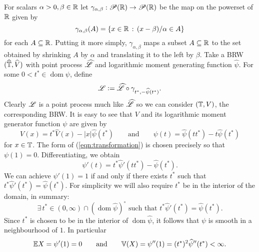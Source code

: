 For scalars $\alpha > 0, \beta \in \mathbb{R}$ let $\gamma_{\alpha, \beta} : \mathscr{P}(\mathbb{R}) \to \mathscr{P}(\mathbb{R})$ be the map on the powerset of $\mathbb{R}$ given by
\begin{equation}
\gamma_{\alpha, \beta}(A) = \{x \in \mathbb{R}\,:\, (x - \beta) / \alpha \in A\}
\end{equation}
for each $A \subseteq \mathbb{R}$. Putting it more simply, $\gamma_{\alpha, \beta}$ maps a subset $A \subseteq \mathbb{R}$ to the set obtained by shrinking $A$ by $\alpha$ and translating it to the left by $\beta$. Take a BRW $(\mathbb{\widehat{T}}, \widehat{V})$ with point process $\widehat{\mathscr{L}}$ and logarithmic moment generating function $\widehat{\psi}$. For some $0 < t^* \in \operatorname*{dom} \psi$, define
\begin{equation}\label{eqn:transformation}
\mathscr{L} \vcentcolon= \widehat{\mathscr{L}} \circ \gamma_{t^* , - \widehat{\psi}(t^*)}. 
\end{equation}
Clearly $\mathscr{L}$ is a point process much like $\widehat{\mathscr{L}}$ so we can consider $(\mathbb{T}, V)$, the corresponding BRW. It is easy to see that $V$ and its logarithmic moment generator function $\psi$ are given by 
\begin{equation}\label{eqn:transformation2}
V(x) = t^* \widehat{V}(x) - |x| \widehat{\psi}(t^*) \qquad\text{and}\qquad \psi(t) = \widehat{\psi}(t t^*) -t \widehat{\psi}(t^*) 
\end{equation}
for $x \in \mathbb{T}$. The form of (\ref{eqn:transformation}) is chosen precisely so that $\psi(1) = 0$. Differentiating, we obtain
\begin{equation}
\psi'(t) = t^* \widehat{\psi}'(t t^*) - \widehat{\psi} (t^*). 
\end{equation}
We can achieve $\psi'(1) = 1$ if and only if there exists $t^*$ such that $t^* \widehat{\psi}'(t^*) = \widehat{\psi} (t^*)$. For simplicity we will also require $t^*$ be in the interior of the domain, in summary:
\begin{equation}\label{eqn:t*exists}
\exists\,t^* \in (0, \infty) \cap (\operatorname*{dom}\widehat{\psi})^\circ\text{ such that } t^* \widehat{\psi}'(t^*) = \widehat{\psi} (t^*). 
\end{equation}
Since $t^*$ is chosen to be in the interior of $\operatorname*{dom}\widehat{\psi}$, it follows that $\psi$ is smooth in a neighbourhood of $1$. In particular
\begin{equation}\nonumber
\mathbb{E}{X} = \psi'(1) = 0 \qquad\text{and}\qquad \mathbb{V}(X) = \psi''(1) = (t^*)^2 \widehat{\psi}''(t^*) < \infty. 
\end{equation} 
